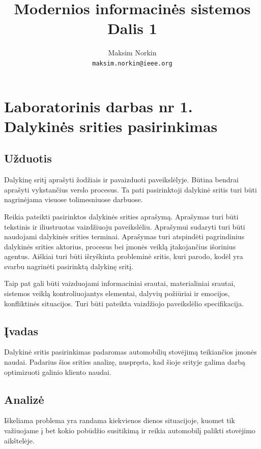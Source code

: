 \documentclass[10pt]{IEEEtran}
\author{Maksim Norkin\\ \texttt{maksim.norkin@ieee.org}}
\title{Modernios informacinės sistemos\\Dalis 1}
\begin{document}
    \maketitle

    \section{Laboratorinis darbas nr 1.\\Dalykinės srities pasirinkimas}

        \subsection{Užduotis}

            Dalykinę sritį aprašyti žodžiais ir pavaizduoti paveikslėlyje. Būtina bendrai aprašyti vykstančius verslo procesus. Ta pati pasirinktoji dalykinė sritis turi būti nagrinėjama visuose  tolimesniuose darbuose. 

            Reikia pateikti pasirinktos dalykinės srities aprašymą. Aprašymas turi būti tekstinis ir iliustruotas vaizdžiuoju paveikslėliu. Aprašymui sudaryti turi būti naudojami dalykinės srities  terminai. Aprašymas turi atspindėti pagrindinius dalykinės srities aktorius, procesus bei įmonės veiklą įtakojančius išorinius agentus. Aiškiai turi būti išryškinta probleminė sritis, kuri parodo, kodėl yra svarbu nagrinėti pasirinktą dalykinę sritį. 

            Taip pat gali būti vaizduojami informaciniai srautai, materialiniai srautai, sistemos veiklą  kontroliuojantys elementai, dalyvių požiūriai ir emocijos, konfliktinės situacijos. Turi būti pateikta vaizdžiojo paveikslėlio specifikacija.

        \subsection{Įvadas}

            Dalykinė sritis pasirinkimas padaromas automobilių stovėjimą teikiančios įmonės naudai. Padarius šios srities analizę, nuspręsta, kad šioje srityje galima darbą optimizuoti galinio kliento naudai.

        \subsection{Analizė}

            Iškeliama problema yra randama kiekvienos dienos situacijoje, kuomet tik važiuojame į bet kokio pobūdžio susitikimą ir reikia automobilį palikti stovėjimo aikštelėje.
\end{document}

